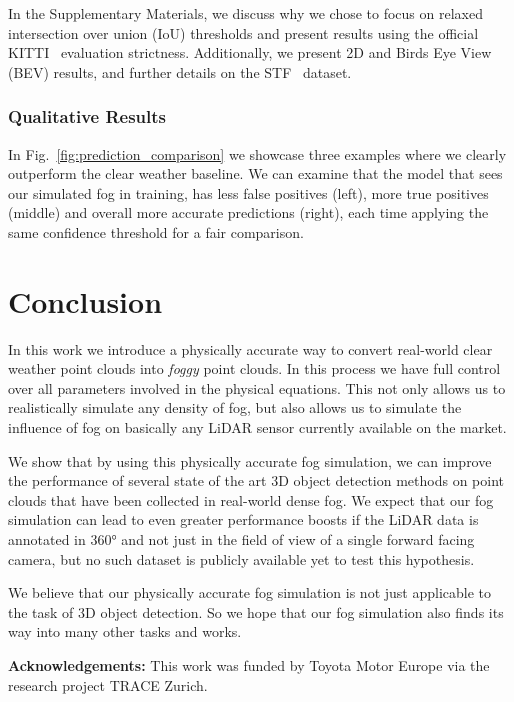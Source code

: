 \documentclass[10pt,twocolumn,letterpaper]{article}
\begin{document}
In the Supplementary Materials, we discuss why we chose to focus on relaxed intersection over union (IoU) thresholds and present results using the official KITTI~\cite{KITTI} evaluation strictness. Additionally, we present 2D and Birds Eye View (BEV) results, and further details on the STF~\cite{STF} dataset. 

\subsubsection{Qualitative Results}
\label{sec:qualitative}

In Fig.~\ref{fig:prediction_comparison} we showcase three examples where we clearly outperform the clear weather baseline. We can examine that the model that sees our simulated fog in training, has less false positives (left), more true positives (middle) and overall more accurate predictions (right), each time applying the same confidence threshold for a fair comparison.  \section{Conclusion}
\label{sec:conclusion}

In this work we introduce a physically accurate way to convert real-world clear weather point clouds into \textit{foggy} point clouds. In this process we have full control over all parameters involved in the physical equations. This not only allows us to realistically simulate any density of fog, but also allows us to simulate the influence of fog on basically any LiDAR sensor currently available on the market.   

We show that by using this physically accurate fog simulation, we can improve the performance of several state of the art 3D object detection methods on point clouds that have been collected in real-world dense fog. We expect that our fog simulation can lead to even greater performance boosts if the LiDAR data is annotated in 360° and not just in the field of view of a single forward facing camera, but no such dataset is publicly available yet to test this hypothesis.

We believe that our physically accurate fog simulation is not just applicable to the task of 3D object detection. So we hope that our fog simulation also finds its way into many other tasks and works. 

\vspace{0.1cm}
\noindent
\textbf{Acknowledgements:} 
This work was funded by Toyota Motor Europe via the research project TRACE Zurich.



 
{\small


}
\end{document}
